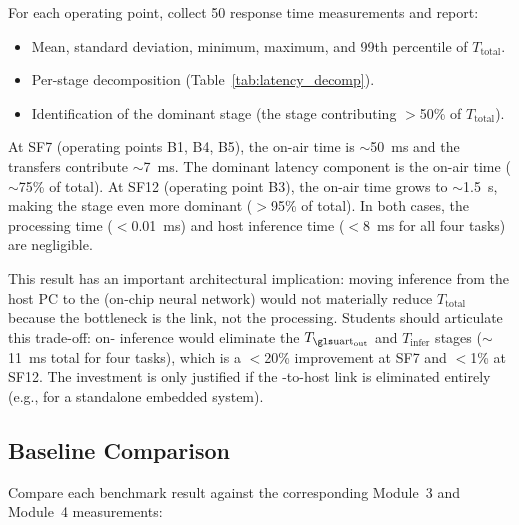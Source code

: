 \documentclass[11pt,letterpaper]{article}
\begin{document}
	For each operating point, collect 50 response time measurements and report:
	\begin{itemize}[leftmargin=2em]
		\item Mean, standard deviation, minimum, maximum, and 99th percentile of $T_{\text{total}}$.
		\item Per-stage decomposition (Table~\ref{tab:latency_decomp}).
		\item Identification of the dominant stage (the stage contributing $>$50\% of $T_{\text{total}}$).
	\end{itemize}

	\begin{tcolorbox}[infobox={Expected Results: Latency Dominance Shift}]
		At SF7 (operating points B1, B4, B5), the \RF{} on-air time is $\sim$50~ms and the \UART{} transfers contribute $\sim$7~ms. The dominant latency component is the \RF{} on-air time ($\sim$75\% of total). At SF12 (operating point B3), the on-air time grows to $\sim$1.5~s, making the \RF{} stage even more dominant ($>$95\% of total). In both cases, the \FPGA{} processing time ($<$0.01~ms) and host inference time ($<$8~ms for all four tasks) are negligible.

		This result has an important architectural implication: moving inference from the host PC to the \FPGA{} (on-chip neural network) would not materially reduce $T_{\text{total}}$ because the bottleneck is the \RF{} link, not the processing. Students should articulate this trade-off: on-\FPGA{} inference would eliminate the $T_{\text{\UART{}\textsubscript{out}}}$ and $T_{\text{infer}}$ stages ($\sim$11~ms total for four tasks), which is a $<$20\% improvement at SF7 and $<$1\% at SF12. The investment is only justified if the \UART{}-to-host link is eliminated entirely (e.g., for a standalone embedded system).
	\end{tcolorbox}

	\subsection{Baseline Comparison}

	Compare each benchmark result against the corresponding Module~3 and Module~4 measurements:
\end{document}
